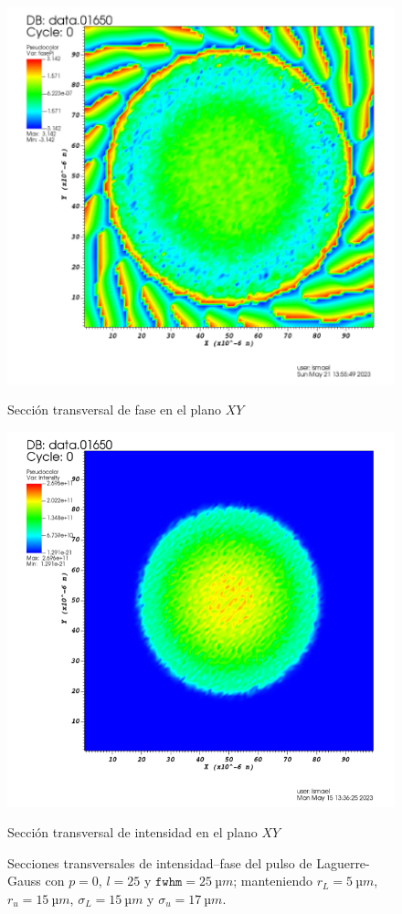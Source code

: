 \begin{figure}[htbp]
  \centering
  \begin{subcaptionblock}{.4\textwidth}
    \centering
    \includegraphics[width=\textwidth]{Figuras/anx_oamfs_5.png}
    \caption*{Sección transversal de fase en el plano $XY$}
  \end{subcaptionblock}
  \begin{subcaptionblock}{.4\textwidth}
    \centering
    \includegraphics[width=\textwidth]{Figuras/anx_oamint_5.png}
    \caption*{Sección transversal de intensidad en el plano $XY$}
  \end{subcaptionblock}
   \caption*{Secciones transversales de intensidad--fase del pulso de Laguerre-Gauss con $p=0$, $l=25$ y $\texttt{fwhm}=\qty{25}{µm}$; manteniendo $r_{L}=\qty{5}{µm}$, $r_{u}=\qty{15}{µm}$, $\sigma_{L}=\qty{15}{µm}$ y $\sigma_{u}=\qty{17}{µm}$.}
\end{figure}

